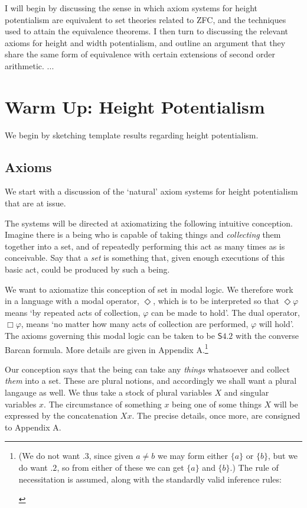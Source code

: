 \documentclass{article}
\begin{document}
I will begin by discussing the sense in which axiom systems for height potentialism
are equivalent to set theories related to ZFC, and the techniques used to attain 
the equivalence theorems. I then turn to discussing the relevant axioms 
for height and width 
potentialism, and outline an argument that they share the same form of equivalence with certain extensions 
of second order arithmetic. ...
\section{Warm Up: Height Potentialism}
We begin by sketching template results regarding height potentialism. 
\subsection{Axioms}
We start with a discussion of the `natural' axiom systems for height potentialism 
that are at issue.

The systems will be directed at axiomatizing the following 
intuitive conception. Imagine there is a being who is capable of taking things 
and \emph{collecting} them together into a set, and of repeatedly performing this act 
as many times as is conceivable. Say that a \emph{set} is something that, given enough 
executions of this basic act, could be produced by such a being. 

We want to axiomatize this conception of set in modal logic. 
We therefore work in a language with a modal operator, $\Diamond$, 
which is to be interpreted so that $\Diamond \varphi$ means
`by repeated acts of collection, $\varphi$ can be made to hold'. The dual 
operator, $\Box \varphi$, means `no matter how many acts of collection are performed, 
$\varphi$ will hold'. The axioms governing this modal logic can be taken to be 
$\mathsf{S4.2}$ with the converse Barcan formula. More details are given in Appendix A.\footnote{(We do not want $.3$, 
since given $a \not= b$ we may form either $\{a\}$ or $\{b\}$, but we do want 
$.2$,
so from either of these we can get $\{a\}$ and $\{b\}$.) The rule of necessitation 
is assumed, along with the standardly valid inference rules:
\begin{prooftree}
\end{prooftree}}
 
Our conception says that the being can take any \emph{things} whatsoever and collect 
\emph{them} into a set. These are plural notions, and accordingly we shall want a plural 
langauge as well. We thus take a stock of plural variables $X$ and singular variables $x$.
The circumstance of something $x$ being one of some things $X$ will be expressed by 
the concatenation $Xx$. The precise details, once more,  are consigned to Appendix A. 
\end{document}
